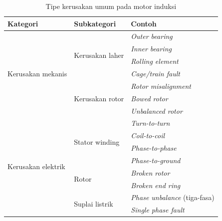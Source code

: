 \documentclass{elsinta}
\begin{document}
\begin{table}[H]
\centering
\caption{Tipe kerusakan umum pada motor induksi\cite{Gangsar2020}}
\label{tab:tipe_kerusakan_IM}
\begin{tabular}{|p{4cm}|p{4cm}|p{4cm}|}
\hline
\textbf{Kategori} & \textbf{Subkategori} & \textbf{Contoh}\\ \hline
\multirow{7}{*}{Kerusakan mekanis}  & \multirow{4}{*}{Kerusakan laher}  & \textit{Outer bearing}                    \\      \cline{3-3}
                                    &                                   & \textit{Inner bearing}                    \\      \cline{3-3}
                                    &                                   & \textit{Rolling element}                  \\      \cline{3-3}
                                    &                                   & \textit{Cage/train fault}                 \\      \cline{2-3}
                                    & \multirow{3}{*}{Kerusakan rotor}  & \textit{Rotor misalignment}            \\      \cline{3-3}
                                    &                                   & \textit{Bowed rotor}                   \\      \cline{3-3}
                                    &                                   & \textit{Unbalanced rotor}                 \\      \hline
\multirow{8}{*}{Kerusakan elektrik} & \multirow{4}{*}{Stator winding}   & \textit{Turn-to-turn}                     \\      \cline{3-3}
                                    &                                   & \textit{Coil-to-coil}                     \\      \cline{3-3}    
                                    &                                   & \textit{Phase-to-phase}                   \\      \cline{3-3}
                                    &                                   & \textit{Phase-to-ground}                  \\      \cline{2-3}
                                    & \multirow{2}{*}{Rotor}            & \textit{Broken rotor}                  \\      \cline{3-3}
                                    &                                   & \textit{Broken end ring}                  \\      \cline{2-3}
                                    & \multirow{2}{*}{Suplai listrik}   & \textit{Phase unbalance} (tiga-fasa)                  \\      \cline{3-3}             
                                    &                                   & \textit{Single phase fault}               \\      \hline
\end{tabular}
\end{table}
\end{document}
